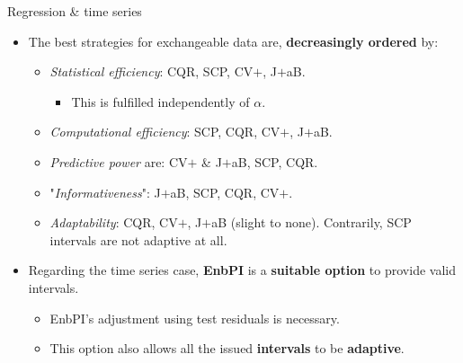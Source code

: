 \documentclass{beamer}
\renewcommand{\a}{\alpha}
\begin{document}
\begin{frame}{Regression \& time series}
\begin{itemize}%
    \item[] The best strategies for exchangeable data are, \textbf{decreasingly ordered} by:
    \begin{itemize}%
        \item \textit{Statistical efficiency}: CQR, SCP, CV$+$, J$+$aB.
        \begin{itemize}%
            \item This is fulfilled independently of $\a$.
        \end{itemize}
        \item \textit{Computational efficiency}: SCP, CQR, CV$+$, J$+$aB.
        \item \textit{Predictive power} are: CV$+$ \& J$+$aB, SCP, CQR.
        \item "\textit{Informativeness}": J$+$aB, SCP, CQR, CV$+$.
        \item \textit{Adaptability}: CQR, CV$+$, J$+$aB (slight to none). Contrarily, SCP intervals are not adaptive at all. 
    \end{itemize}
    \item[] Regarding the time series case, \textbf{EnbPI} is a \textbf{suitable option} to provide valid intervals.
    \begin{itemize}%
        \item EnbPI's adjustment using test residuals is necessary.
        \item This option also allows all the issued \textbf{intervals} to be \textbf{adaptive}.
    \end{itemize}
        
\end{itemize}
\end{frame}


\end{document}

